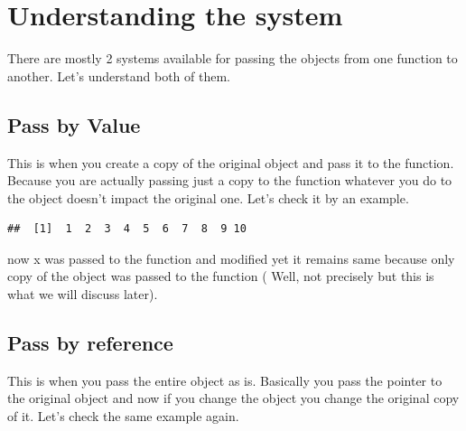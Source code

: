 \documentclass[
]{book}
\newenvironment{Shaded}{\begin{snugshade}}{\end{snugshade}}
\newcommand{\AttributeTok}[1]{\textcolor[rgb]{0.77,0.63,0.00}{#1}}
\newcommand{\ControlFlowTok}[1]{\textcolor[rgb]{0.13,0.29,0.53}{\textbf{#1}}}
\newcommand{\DecValTok}[1]{\textcolor[rgb]{0.00,0.00,0.81}{#1}}
\newcommand{\FunctionTok}[1]{\textcolor[rgb]{0.00,0.00,0.00}{#1}}
\newcommand{\NormalTok}[1]{#1}
\newcommand{\OtherTok}[1]{\textcolor[rgb]{0.56,0.35,0.01}{#1}}
\newcommand{\SpecialCharTok}[1]{\textcolor[rgb]{0.00,0.00,0.00}{#1}}
\begin{document}
\hypertarget{understanding-the-system}{%
\section{Understanding the system}\label{understanding-the-system}}

There are mostly 2 systems available for passing the objects from one function to another. Let's understand both of them.

\hypertarget{pass-by-value}{%
\subsection{Pass by Value}\label{pass-by-value}}

This is when you create a copy of the original object and pass it to the function. Because you are actually passing just a copy to the function whatever you do to the object doesn't impact the original one. Let's check it by an example.

\begin{Shaded}
\end{Shaded}

\begin{verbatim}
##  [1]  1  2  3  4  5  6  7  8  9 10
\end{verbatim}

now x was passed to the function and modified yet it remains same because only copy of the object was passed to the function ( Well, not precisely but this is what we will discuss later).

\hypertarget{pass-by-reference}{%
\subsection{Pass by reference}\label{pass-by-reference}}

This is when you pass the entire object as is. Basically you pass the pointer to the original object and now if you change the object you change the original copy of it. Let's check the same example again.
\end{document}
